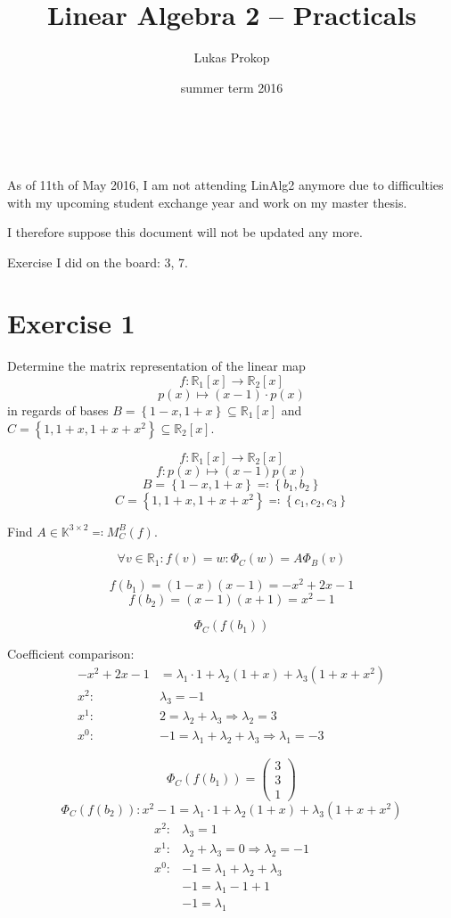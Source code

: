 \documentclass[a4paper]{article}
\title{Linear Algebra 2 -- Practicals}
\author{Lukas Prokop}
\date{summer term 2016}
\theoremstyle{definition}
\newcommand\set[1]{\left\{#1\right\}}
\begin{document}
~

\vspace{200pt}
{\Huge
  As of 11th of May 2016,
  I am not attending LinAlg2
  anymore due to difficulties
  with my upcoming student exchange year
  and work on my master thesis.

  I therefore suppose this document will not be updated any more.
}
\newpage


\maketitle
\tableofcontents

\clearpage
Exercise I did on the board: 3, 7.

\section{Exercise 1}
\begin{ex}
  Determine the matrix representation of the linear map
  \[ f: \mathbb R_1[x] \to \mathbb R_2[x] \]
  \[ p(x) \mapsto (x-1) \cdot p(x) \]
  in regards of bases $B = \set{1-x, 1+x} \subseteq \mathbb R_1[x]$ and $C = \set{1, 1 + x, 1 + x + x^2} \subseteq \mathbb R_2[x]$.
\end{ex}

\[
  f: \mathbb R_1[x] \to \mathbb R_2[x]
\] \[
  f: p(x) \mapsto (x-1) p(x)
\] \[
  B = \set{1-x, 1+x} \eqqcolon \set{b_1, b_2}
\] \[
  C = \set{1, 1+x, 1+x+x^2} \eqqcolon \set{c_1, c_2, c_3}
\]

Find $A \in \mathbb K^{3\times 2} \eqqcolon M_C^B(f)$.

\[ \forall v \in \mathbb R_1: f(v) = w : \Phi_C(w) = A \Phi_B(v) \]

\[ f(b_1) = (1-x)(x-1) = -x^2 + 2x - 1 \]
\[ f(b_2) = (x-1)(x+1) = x^2 - 1 \]

\[ \Phi_C(f(b_1)) \]

Coefficient comparison:
\begin{align*}
  -x^2 + 2x - 1 &= \lambda_1 \cdot 1 + \lambda_2 (1 + x) + \lambda_3 (1 + x + x^2) \\
  x^2: & \lambda_3 = -1 \\
  x^1: & 2 = \lambda_2 + \lambda_3 \Rightarrow \lambda_2 = 3 \\
  x^0: & -1 = \lambda_1 + \lambda_2 + \lambda_3 \Rightarrow \lambda_1 = -3
\end{align*}

\[ \Phi_C(f(b_1)) = \begin{pmatrix} 3 \\ 3 \\ 1 \end{pmatrix} \]
\[ \Phi_C(f(b_2)): x^2 - 1 = \lambda_1 \cdot 1 + \lambda_2 (1 + x) + \lambda_3 (1 + x + x^2) \]
\begin{align*}
  x^2: & \lambda_3 = 1 \\
  x^1: & \lambda_2 + \lambda_3 = 0 \Rightarrow \lambda_2 = -1 \\
  x^0: & -1 = \lambda_1 + \lambda_2 + \lambda_3 \\
       & -1 = \lambda_1 - 1 + 1 \\
       & -1 = \lambda_1
\end{align*}
\end{document}
